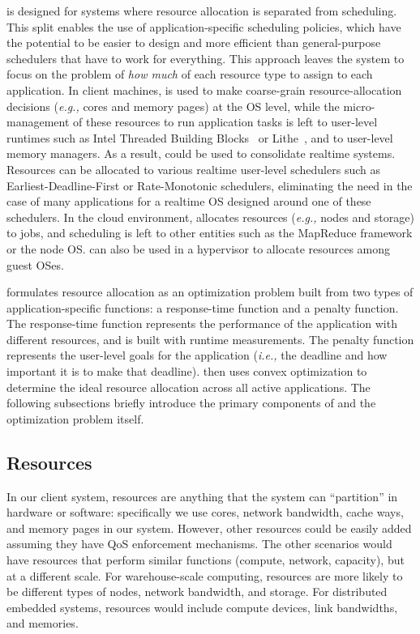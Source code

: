 \pacora is designed for systems where resource allocation is separated
from scheduling.  This split enables the use of application-specific
scheduling policies, which have the potential to be easier to design
and more efficient than general-purpose schedulers that have to work
for everything.  This approach leaves the system to focus on the
problem of \emph{how much} of each resource type to assign to each
application.  In client machines, \pacora is used to make coarse-grain
resource-allocation decisions (\emph{e.g.,} cores and memory pages) at
the OS level, while the micro-management of these resources to run
application tasks is left to user-level runtimes such as Intel
Threaded Building Blocks~\cite{CoMa08} or Lithe~\cite{lithe}, and to
user-level memory managers.  As a result, \pacora could be used to consolidate realtime systems.  Resources can be allocated to various realtime user-level schedulers such as Earliest-Deadline-First or Rate-Monotonic schedulers, eliminating the need in the case of many applications for a realtime OS designed around one of these schedulers.  In the cloud environment, \pacora allocates
resources (\emph{e.g.,} nodes and storage) to jobs, and scheduling is
left to other entities such as the MapReduce framework\cite{mapreduce}
or the node OS.  \pacora can also be used in a hypervisor to allocate
resources among guest OSes.

\pacora formulates resource allocation as an optimization problem
built from two types of application-specific functions: a
response-time function and a penalty function. The response-time
function represents the performance of the application with different
resources, and is built with runtime measurements.  The penalty
function represents the user-level goals for the application
(\emph{i.e.,} the deadline and how important it is to make that
deadline). \pacora then uses convex optimization\cite{BoVa} to
determine the ideal resource allocation across all active
applications.  The following subsections briefly introduce the primary
components of \pacora and the optimization problem itself.

\subsection{Resources}

In our client system, resources are anything that the system can
``partition'' in hardware or software: specifically we use cores,
network bandwidth, cache ways, and memory pages in our system.
However, other resources could be easily added assuming they have QoS
enforcement mechanisms.  The other scenarios would have resources that
perform similar functions (compute, network, capacity), but at a
different scale. For warehouse-scale computing, resources are more
likely to be different types of nodes, network bandwidth, and
storage. For distributed embedded systems, resources would include
compute devices, link bandwidths, and memories.

